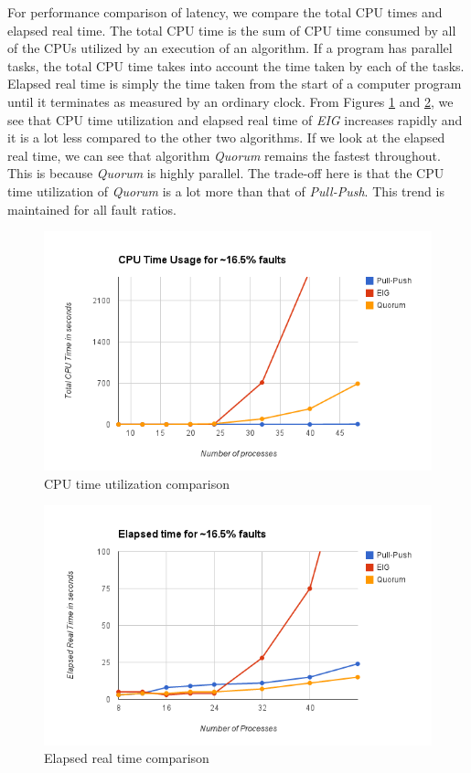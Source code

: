 For performance comparison of latency, we compare the total CPU times and elapsed real time.  The total CPU time is the sum of CPU time consumed by all of the CPUs utilized by an execution of an algorithm. If a program has parallel tasks, the total CPU time takes into account the time taken by each of the tasks. Elapsed real time is simply the time taken from the start of a computer program until it terminates as measured by an ordinary clock. From Figures \ref{fig:cpu} and \ref{fig:elapsed}, we see that CPU time utilization and elapsed real time of \textit{EIG} increases rapidly and it is a lot less compared to the other two algorithms. If we look at the elapsed real time, we can see that algorithm \textit{Quorum} remains the fastest throughout. This is because \textit{Quorum} is highly parallel. The trade-off here is that the CPU time utilization of \textit{Quorum} is a lot more than that of \textit{Pull-Push}. This trend is maintained for all fault ratios.

\begin{figure}[ht]
 \centering
\includegraphics[scale=0.4]{cpu16}
\caption{CPU time utilization comparison}
 \label{fig:cpu}
\vspace{-2mm}
\end{figure}

\begin{figure}[ht]
 \centering
\includegraphics[scale=0.4]{elapsed16}
\caption{Elapsed real time comparison}
 \label{fig:elapsed}
\vspace{-2mm}
\end{figure}

